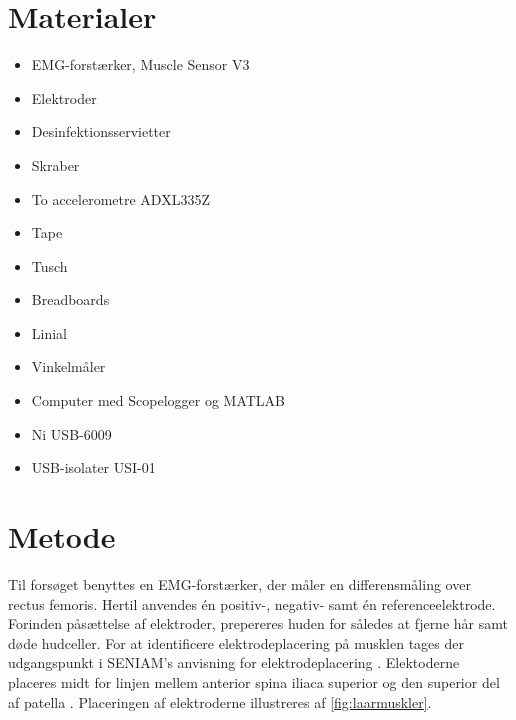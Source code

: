 \section{Materialer} 
\begin{itemize}
\item EMG-forstærker, Muscle Sensor V3
\item Elektroder
\item Desinfektionsservietter
\item Skraber
\item To accelerometre ADXL335Z
\item Tape
\item Tusch
\item Breadboards
\item Linial 
\item Vinkelmåler
\item Computer med Scopelogger og MATLAB
\item Ni USB-6009
\item USB-isolater USI-01
\end{itemize}

\section{Metode}

Til forsøget benyttes en EMG-forstærker, der måler en differensmåling over rectus femoris. Hertil anvendes én positiv-, negativ- samt én referenceelektrode. Forinden påsættelse af elektroder, prepereres huden for således at fjerne hår samt døde hudceller.
For at identificere elektrodeplacering på musklen tages der udgangspunkt i SENIAM's anvisning for elektrodeplacering \citep{seniam2016}. 
Elektoderne placeres midt for linjen mellem anterior spina iliaca superior og den superior del af patella \citep{seniam2016}. Placeringen af elektroderne illustreres af \autoref{fig:laarmuskler}.

